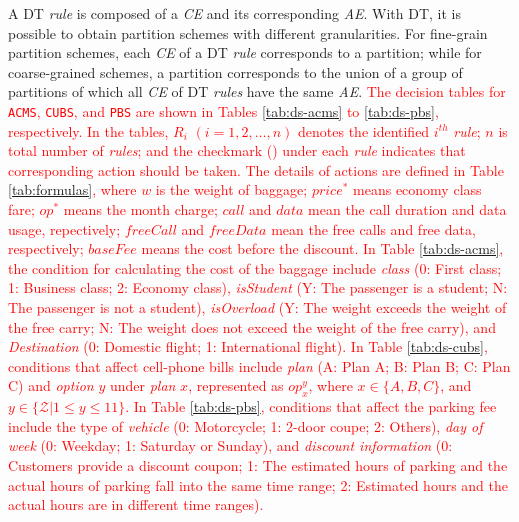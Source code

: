 \documentclass[10pt,journal,compsoc]{IEEEtran}
\begin{document}
A DT \emph{rule} is composed of a \emph{CE} and its corresponding \emph{AE}.
With DT, it is possible to obtain partition schemes with different granularities.
For fine-grain partition schemes, each \emph{CE} of a DT \emph{rule} corresponds to a partition;
while for coarse-grained schemes, a partition corresponds to the union of a group of partitions of which all \emph{CE} of DT \emph{rules} have the same \emph{AE}.
\textcolor{red}{The decision tables for \texttt{ACMS}, \texttt{CUBS}, and \texttt{PBS} are shown in Tables \ref{tab:ds-acms} to \ref{tab:ds-pbs}, respectively. In the tables, $R_i$ $(i = 1, 2, \ldots, n)$ denotes the identified $i^{th}$ \emph{rule}; $n$ is total number of \emph{rules}; and the checkmark (\checkmark) under each \emph{rule} indicates that corresponding action should be taken.
The details of actions are defined in Table \ref{tab:formulas}, where $w$ is the weight of baggage; $price^*$ means economy class fare; $op^*$ means the month charge; $call$ and $data$ mean the call duration and data usage, repectively; $freeCall$ and $freeData$ mean the free calls and free data, respectively; $baseFee$ means the cost before the discount. In Table \ref{tab:ds-acms}, the condition for calculating the cost of the baggage include \emph{class} (0: First class; 1: Business class; 2: Economy class), \emph{isStudent} (Y: The passenger is a student; N: The passenger is not a student), \emph{isOverload} (Y: The weight exceeds the weight of the free carry; N: The weight does not exceed the weight of the free carry), and \emph{Destination} (0: Domestic flight; 1: International flight). In Table \ref{tab:ds-cubs}, conditions that affect cell-phone bills include \emph{plan} (A: Plan A; B: Plan B; C: Plan C) and \emph{option} $y$ under \emph{plan} $x$, represented as $op_x^y$, where $x \in \{A, B, C\}$, and $y \in \{\mathcal{Z} |1 \le y \le 11\}$. In Table \ref{tab:ds-pbs}, conditions that affect the parking fee include the type of \emph{vehicle} (0: Motorcycle; 1: 2-door coupe; 2: Others), \emph{day of week} (0: Weekday; 1: Saturday or Sunday), and \emph{discount information} (0: Customers provide a discount coupon; 1: The estimated hours of parking and the actual hours of parking fall into the same time range; 2: Estimated hours and the actual hours are in different time ranges).}
\end{document}
